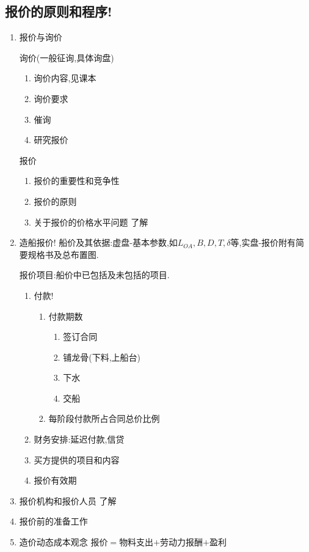 \documentclass[UTF8,a4paper]{ctexart}
\begin{document}
		\subsection{报价的原则和程序!}
			\begin{enumerate}[1)]
				\item 报价与询价
					
					询价(一般征询,具体询盘)
					\begin{enumerate}[-]
						\item 询价内容,见课本
						\item 询价要求
						\item 催询
						\item 研究报价
					\end{enumerate}
				
					报价
					\begin{enumerate}[-]
						\item 报价的重要性和竞争性
						\item 报价的原则 
							
						\item 关于报价的价格水平问题 了解
					\end{enumerate}		
				
				\item 造船报价!
					船价及其依据:虚盘-基本参数,如$L_{OA}, B, D, T, \delta$等,实盘-报价附有简要规格书及总布置图.
					
					报价项目:船价中已包括及未包括的项目.
					\begin{enumerate}[.]
						\item 付款!
							\begin{enumerate}[-]
								\item 付款期数
									\begin{enumerate}[.]
										\item 签订合同
										\item 铺龙骨(下料,上船台)
										\item 下水
										\item 交船
									\end{enumerate}
								\item 每阶段付款所占合同总价比例
							\end{enumerate}
						\item  财务安排:延迟付款,信贷
						\item 买方提供的项目和内容
						\item 报价有效期
					\end{enumerate}
				\item 报价机构和报价人员 了解
				\item 报价前的准备工作
				\item 造价动态成本观念 报价$=$物料支出$+$劳动力报酬$+$盈利
			\end{enumerate}	
	
\end{document}
